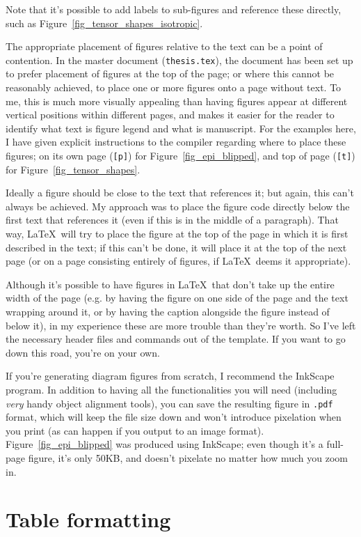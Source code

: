 Note that it's possible to add labels to sub-figures and reference these directly, such as Figure~\ref{fig_tensor_shapes_isotropic}.

The appropriate placement of figures relative to the text can be a point of contention. In the master document (\verb+thesis.tex+), the document has been set up to prefer placement of figures at the top of the page; or where this cannot be reasonably achieved, to place one or more figures onto a page without text. To me, this is much more visually appealing than having figures appear at different vertical positions within different pages, and makes it easier for the reader to identify what text is figure legend and what is manuscript. For the examples here, I have given explicit instructions to the compiler regarding where to place these figures; on its own page (\verb+[p]+) for Figure~\ref{fig_epi_blipped}, and top of page (\verb+[t]+) for Figure~\ref{fig_tensor_shapes}.

Ideally a figure should be close to the text that references it; but again, this can't always be achieved. My approach was to place the figure code directly below the first text that references it (even if this is in the middle of a paragraph). That way, \LaTeX~will try to place the figure at the top of the page in which it is first described in the text; if this can't be done, it will place it at the top of the next page (or on a page consisting entirely of figures, if \LaTeX~deems it appropriate).

Although it's possible to have figures in \LaTeX~that don't take up the entire width of the page (e.g. by having the figure on one side of the page and the text wrapping around it, or by having the caption alongside the figure instead of below it), in my experience these are more trouble than they're worth. So I've left the necessary header files and commands out of the template. If you want to go down this road, you're on your own.

If you're generating diagram figures from scratch, I recommend the InkScape program. In addition to having all the functionalities you will need (including {\em very} handy object alignment tools), you can save the resulting figure in \verb+.pdf+ format, which will keep the file size down and won't introduce pixelation when you print (as can happen if you output to an image format). Figure~\ref{fig_epi_blipped} was produced using InkScape; even though it's a full-page figure, it's only 50KB, and doesn't pixelate no matter how much you zoom in.
%
%
\section{Table formatting}

